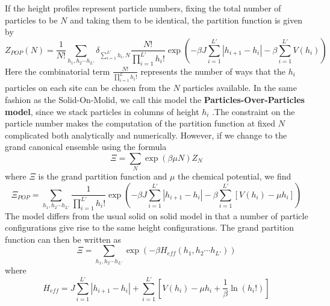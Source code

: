 If the height profiles represent particle numbers, fixing the total number of particles to be $N$ and taking them to be identical, the partition function is given by
\begin{equation}
Z_{POP}(N) = \frac{1}{N!}\sum_{h_1,h_2\cdots h_{L'}} \delta_{\sum_{i=1}^{L'} h_i, N}\frac{N!}{\prod_{i=1}^{L'} h_i!} \exp\left(-\beta J \sum_{i=1}^{L'} |h_{i+1}-h_i| -\beta\sum_{i=1}^{L'} V(h_i)\right)
\end{equation}
Here the combinatorial term $\frac{N!}{\prod_{i=1}^L h_i!}$ represents the number of ways that the $h_i$ particles on each site can be chosen from the $N$ particles available. In the same fashion as the Solid-On-Molid, we call this model the \textbf{Particles-Over-Particles model}, since we stack particles in columns of height $h_i$ .The constraint on the particle number makes the computation of the partition function at fixed $N$ complicated both analytically and numerically. However, if we change to the grand canonical ensemble using
the formula
\begin{equation}
\Xi = \sum_{N} \exp(\beta\mu N) Z_N
\end{equation}
where $\Xi$ is the grand partition function and $\mu$ the chemical potential, we find
\begin{equation}
\Xi_{POP} = \sum_{h_1,h_2\cdots h_{L'}} \frac{1}{\prod_{i=1}^{L'} h_i!} \exp\left(-\beta J \sum_{i=1}^{L'} |h_{i+1}-h_i| -\beta\sum_{i=1}^{L'}[ V(h_i)-\mu h_i]\right)
\end{equation}
The model differs from the usual solid on solid model in that a number of particle configurations give rise to the same height configurations. The grand partition function can then be written as 
\begin{equation}
\Xi = \sum_{h_1,h_2\cdots h_{L'}} \exp\left(-\beta H_{eff}(h_1,h_2\cdots h_{L'})\right)
\end{equation}
where 
\begin{equation}
    H_{eff}= J \sum_{i=1}^{L'} |h_{i+1}-h_i| +\sum_{i=1}^{L'} [V(h_i)-\mu h_i +\frac{1}{\beta}\ln(h_i !)]
    \label{heff-pop}
\end{equation}


